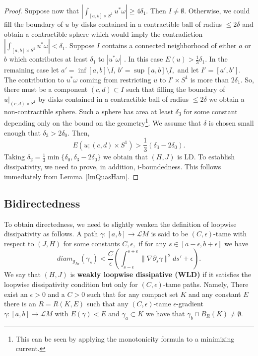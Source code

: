 \documentclass[11pt]{amsart}
\theoremstyle{definition}
\theoremstyle{remark}
\begin{document}
\begin{proof}
Suppose now that $|\int_{[a,b]\times S^1}u^*\omega|\geq 4\delta_1$. Then $I\neq\emptyset$. Otherwise, we could fill the boundary of $u$ by disks contained in a contractible ball of radius $\leq 2\delta$ and obtain a contractible sphere which would imply the contradiction $|\int_{[a,b]\times S^1}u^*\omega|< \delta_1$. Suppose $I$ contains a connected neighborhood of either $a$ or $b$ which contributes at least $\delta_1$ to $|u^*\omega|$ . In this case $E(u)>\frac13\delta_1$. In the  remaining case let $a'=\inf[a,b]\setminus I$, $b'=\sup [a,b]\setminus I,$ and let $I'=[a',b']$. The contribution to $u^*\omega$ coming from restricting $u$ to $I'\times S^1$ is more than $2\delta_1$. So, there must be a component  $(c,d)\subset I$  such that filling the boundary of $u|_{(c,d)\times S^1}$ by disks contained in a contractible ball of radius $\leq 2\delta$ we obtain a non-contractible sphere. Such a sphere has area at least $\delta_3$ for some constant depending only on the bound on the geometry\footnote{This can be seen by applying the monotonicity formula to a minimizing current.}. We assume that $\delta$ is chosen small enough that $\delta_3>2\delta_0$. Then,
\[
E(u;(c,d)\times S^1)>\frac13 ( \delta_3-2\delta_0).
\]
Taking $\delta_2=\frac13\min\{\delta_0,\delta_3-2\delta_0\}$ we obtain that $(H,J)$ is LD. To establish dissipativity, we need to prove, in addition, i-boundedness. This follows immediately from Lemma~\ref{lmQuasHam}.

\end{proof}
\subsection{Bidirectedness}
To obtain directedness, we need to slightly weaken the definition of loopwise dissipativity as follows. A path $\gamma:[a,b]\to\mathcal{L}M$ is said to be $(C,\epsilon)$-tame with respect to $(J,H)$ for some constants $C,\epsilon,$ if for any $s\in[a-\epsilon,b+\epsilon]$ we have
\[
diam_{g_{J_H}}(\gamma_s)<\frac{C}{\epsilon}\left(\int_{s-\epsilon}^{s+\epsilon}\|\nabla\partial_s\gamma\|^2ds'+\epsilon\right).
\]
We say that $(H,J)$ is \textbf{weakly loopwise dissipative (WLD)} if it satisfies the loopwise dissipativity condition but only for $(C,\epsilon)$-tame paths. Namely, There exist an $\epsilon>0$ and a $C>0$ such that for any compact set $K$ and any constant $E$ there is an $R=R(K,E)$ such that any $(C,\epsilon)$-tame $\epsilon$-gradient $\gamma:[a,b]\to\mathcal{L}M$ with $E(\gamma)<E$ and $\gamma_a\subset K$ we have that $\gamma_b\cap B_R(K)\neq\emptyset$.
\end{document}

